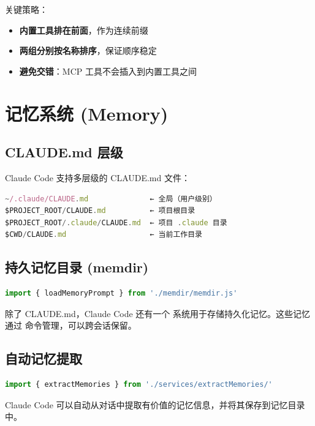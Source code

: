关键策略：
\begin{itemize}[nosep]
  \item \textbf{内置工具排在前面}，作为连续前缀
  \item \textbf{两组分别按名称排序}，保证顺序稳定
  \item \textbf{避免交错}：MCP 工具不会插入到内置工具之间
\end{itemize}

\section{记忆系统 (Memory)}

\subsection{CLAUDE.md 层级}

Claude Code 支持多层级的 CLAUDE.md 文件：

\begin{lstlisting}[language=TypeScript,breaklines=true]
~/.claude/CLAUDE.md              ← 全局（用户级别）
$PROJECT_ROOT/CLAUDE.md          ← 项目根目录
$PROJECT_ROOT/.claude/CLAUDE.md  ← 项目 .claude 目录
$CWD/CLAUDE.md                   ← 当前工作目录
\end{lstlisting}

\subsection{持久记忆目录 (memdir)}

\begin{lstlisting}[language=TypeScript,breaklines=true]
import { loadMemoryPrompt } from './memdir/memdir.js'
\end{lstlisting}

除了 CLAUDE.md，Claude Code 还有一个  系统用于存储持久化记忆。这些记忆通过  命令管理，可以跨会话保留。

\subsection{自动记忆提取}

\begin{lstlisting}[language=TypeScript,breaklines=true]
import { extractMemories } from './services/extractMemories/'
\end{lstlisting}

Claude Code 可以自动从对话中提取有价值的记忆信息，并将其保存到记忆目录中。

